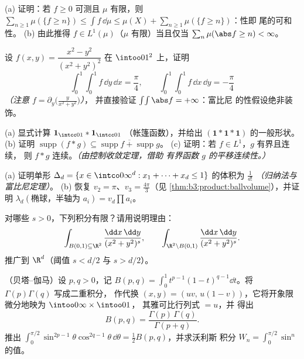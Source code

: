 \begin{exercise}[$\star\star$]\label{exo:b3:product:3}
(a) 证明：若 $f \geq 0$ 可测且 $\mu$ 有限，则
$\sum_{n\geq1}\mu(\{f \geq n\}) \leq \int f\,\dd\mu \leq
\mu(X) + \sum_{n\geq1}\mu(\{f\geq n\})$：性即
尾的可和性。
(b) 由此推得 $f \in L^1(\mu)$（$\mu$ 有限）当且仅当
$\sum_n\mu(\abs f \geq n) < \infty$。
\end{exercise}

\begin{exercise}[$\star\star$]\label{exo:b3:product:4}
设 $f(x, y) = \dfrac{x^2 - y^2}{(x^2 + y^2)^2}$ 在
$\intoo01^2$ 上，证明
\[
\int_0^1\!\!\int_0^1 f\,\dd y\,\dd x = \frac\pi4,
\qquad
\int_0^1\!\!\int_0^1 f\,\dd x\,\dd y = -\frac\pi4
\]
\emph{（注意 $f = \partial_y\bigl(\frac{y}{x^2+y^2}\bigr)$）}，
并直接验证 $\int\!\int\abs f = +\infty$：富比尼
的性假设绝非装饰。
\end{exercise}

\begin{exercise}[$\star\star$]\label{exo:b3:product:5}
(a) 显式计算 $\mathbf 1_{\intcc01} * \mathbf 1_{\intcc01}$
（帐篷函数），并给出 $(\mathbf 1 * \mathbf 1 *
\mathbf 1)$ 的一般形状。
(b) 证明 $\operatorname{supp}(f * g) \subseteq
\overline{\operatorname{supp}f + \operatorname{supp}g}$。
(c) 证明：若 $f \in L^1$，$g$ 有界且连续，
则 $f * g$ 连续。\emph{（由控制收敛定理，借助
有界函数 $g$ 的平移连续性。）}
\end{exercise}

\begin{exercise}[$\star\star$]\label{exo:b3:product:6}
(a) 证明单形 $\Delta_d = \{x \in \intco0\infty^d
: x_1 + \dots + x_d \leq 1\}$ 的体积为 $\frac1{d!}$
\emph{（归纳法与富比尼定理）}。
(b) 恢复 $v_2 = \pi$、$v_3 = \frac{4\pi}3$（见
\cref{thm:b3:product:ballvolume}），并证明
$\lambda_d(\text{椭球，半轴为 } a_i) =
v_d\prod a_i$。
\end{exercise}

\begin{exercise}[$\star\star$]\label{exo:b3:product:7}
对哪些 $s > 0$，下列积分有限？请用说明理由：
\[
\int_{B(0,1)\subseteq\R^2}\frac{\dd x\,\dd y}{(x^2 +
y^2)^{s}},
\qquad
\int_{\R^2\setminus B(0,1)}\frac{\dd x\,\dd y}{(x^2 +
y^2)^{s}} .
\]
推广到 $\R^d$（阈值 $s < d/2$ 与 $s > d/2$）。
\end{exercise}

\begin{exercise}[$\star\star\star$]\label{exo:b3:product:8}
（贝塔--伽马）设 $p, q > 0$，记 $B(p, q) = \int_0^1t^{p-1}(1
- t)^{q-1}\dd t$。将 $\Gamma(p)\Gamma(q)$ 写成二重积分，
作代换 $(x, y) = (uv,\, u(1 - v))$，它将开象限
微分地映为 $\intoo0\infty\times\intoo01$，
其雅可比行列式 $= u$，并
得出
\[
B(p, q) = \frac{\Gamma(p)\,\Gamma(q)}{\Gamma(p + q)} .
\]
推出 $\int_0^{\pi/2}\sin^{2p-1}\theta\cos^{2q-1}\theta\,
\dd\theta = \frac12B(p,q)$，并求沃利斯
积分 $W_n = \int_0^{\pi/2}\sin^n$ 的值。
\end{exercise}

